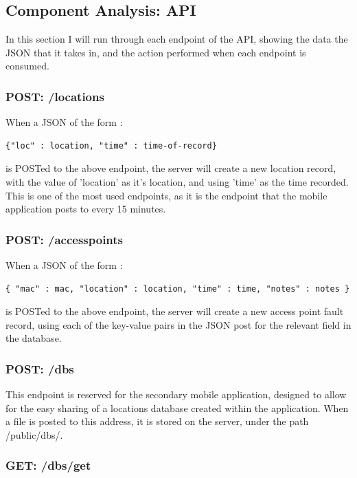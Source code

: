 \documentclass[11pt]{informatics-report}
\begin{document}
\subsection{Component Analysis: API}

In this section I will run through each endpoint of the API, showing the data the JSON that it takes in, and the action performed when each endpoint is consumed.

\subsubsection{POST: /locations}

When a JSON of the form :

\begin{verbatim}
{"loc" : location, "time" : time-of-record}
\end{verbatim}

is POSTed to the above endpoint, the server will create a new location record, with the value of 'location' as it's location, and using 'time' as the time recorded. This is one of the most used endpoints, as it is the endpoint that the mobile application posts to every 15 minutes.

\subsubsection{POST: /accesspoints}

When a JSON of the form :

\begin{verbatim}
{ "mac" : mac, "location" : location, "time" : time, "notes" : notes }
\end{verbatim}
is POSTed to the above endpoint, the server will create a new access point fault record, using each of the key-value pairs in the JSON post for the relevant field in the database.

\subsubsection{POST: /dbs}

This endpoint is reserved for the secondary mobile application, designed to allow for the easy sharing of a locations database created within the application. When a file is posted to this address, it is stored on the server, under the path /public/dbs/.

\subsubsection{GET: /dbs/get}
\end{document}

